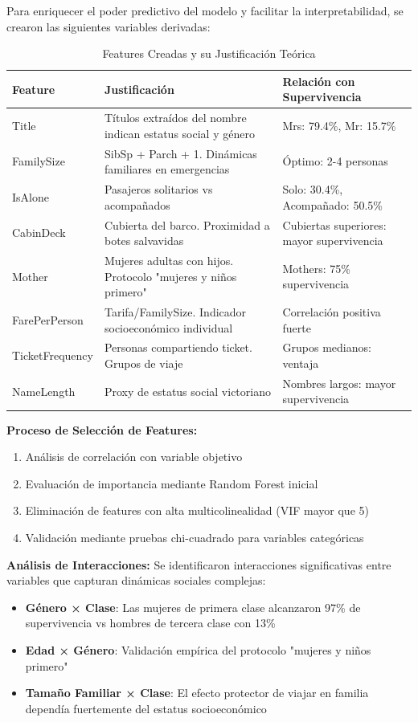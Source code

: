 \documentclass[conference]{IEEEtran}
\begin{document}
Para enriquecer el poder predictivo del modelo y facilitar la interpretabilidad, se crearon las siguientes variables derivadas:

\begin{table}[htbp]
\caption{Features Creadas y su Justificación Teórica}
\label{tab:features_extended}
\begin{center}
\begin{tabular}{|l|p{3cm}|p{2.75cm}|}
\hline
\textbf{Feature} & \textbf{Justificación} & \textbf{Relación con Supervivencia} \\
\hline
Title & Títulos extraídos del nombre indican estatus social y género & Mrs: 79.4\%, Mr: 15.7\% \\
FamilySize & SibSp + Parch + 1. Dinámicas familiares en emergencias & Óptimo: 2-4 personas \\
IsAlone & Pasajeros solitarios vs acompañados & Solo: 30.4\%, Acompañado: 50.5\% \\
CabinDeck & Cubierta del barco. Proximidad a botes salvavidas & Cubiertas superiores: mayor supervivencia \\
Mother & Mujeres adultas con hijos. Protocolo "mujeres y niños primero" & Mothers: 75\% supervivencia \\
FarePerPerson & Tarifa/FamilySize. Indicador socioeconómico individual & Correlación positiva fuerte \\
TicketFrequency & Personas compartiendo ticket. Grupos de viaje & Grupos medianos: ventaja \\
NameLength & Proxy de estatus social victoriano & Nombres largos: mayor supervivencia \\
\hline
\end{tabular}
\end{center}
\end{table}

\textbf{Proceso de Selección de Features:}
\begin{enumerate}
\item Análisis de correlación con variable objetivo
\item Evaluación de importancia mediante Random Forest inicial
\item Eliminación de features con alta multicolinealidad (VIF mayor que  5)
\item Validación mediante pruebas chi-cuadrado para variables categóricas
\end{enumerate}

\textbf{Análisis de Interacciones:}
Se identificaron interacciones significativas entre variables que capturan dinámicas sociales complejas:
\begin{itemize}
\item \textbf{Género × Clase}: Las mujeres de primera clase alcanzaron 97\% de supervivencia vs hombres de tercera clase con 13\%
\item \textbf{Edad × Género}: Validación empírica del protocolo "mujeres y niños primero"
\item \textbf{Tamaño Familiar × Clase}: El efecto protector de viajar en familia dependía fuertemente del estatus socioeconómico
\end{itemize}
\end{document}
